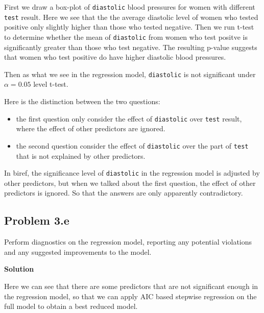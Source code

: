 \documentclass[12pt,oneside,a4paper]{article}\usepackage[]{graphicx}\usepackage[]{xcolor}
\newcommand{\subproblem}[1]
{
    \subsection*{Problem {#1}}
}
\newcommand{\solution}
{
    \vspace{15pt}
    \noindent\ignorespaces\textbf{\large Solution}\par
}
\newcommand{\m}[1]{\texttt{{#1}}}
\begin{document}
First we draw a box-plot of \m{diastolic} blood pressures for women with different \m{test} result. Here we see that the the average diastolic level of women who tested positive only slightly higher than those who tested negative. Then we run t-test to determine whether the mean of \m{diastolic} from women who test positve is significantly greater than those who test negative. The resulting p-value suggests that women who test positive do have higher diastolic blood pressures. 

Then as what we see in the regression model, \m{diastolic} is not significant under $\alpha = 0.05$ level t-test.

Here is the distinction between the two questions:
\begin{itemize}
    \item the first question only consider the effect of \m{diastolic} over \m{test} result, where the effect of other predictors are ignored.
    \item the second question consider the effect of \m{diastolic} over the part of \m{test} that is not explained by other predictors.
\end{itemize}

In biref, the significance level of \m{diastolic} in the regression model is adjusted by other predictors, but when we talked about the first question, the effect of other predictors is ignored. So that the answers are only apparently contradictory.

\subproblem{3.e}
Perform diagnostics on the regression model, reporting any potential violations and any suggested improvements to the model.

\solution
Here we can see that there are some predictors that are not significant enough in the regression model, so that we can apply AIC based stepwise regression on the full model to obtain a best reduced model.
\end{document}
